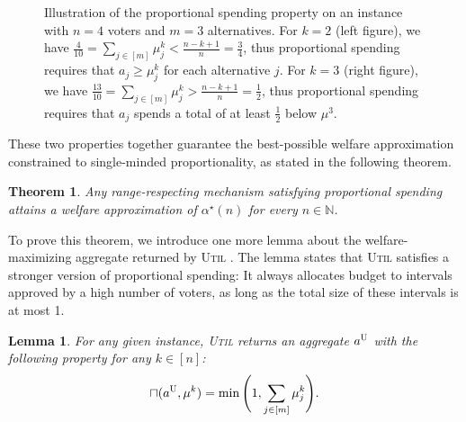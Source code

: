 \documentclass[11pt]{article}
\newcommand{\N}{\mathbb{N}}
\newcommand{\overlap}[2]{\sqcap(#1, #2)}
\newcommand{\Ut}{\textsc{Util} }
\newcommand{\Uts}{\textsc{U} } %
\newtheorem{theorem}{Theorem}
\newtheorem{lemma}{Lemma}
\begin{document}
\begin{figure}
\begin{subfigure}[t]{0.48\textwidth}
    \end{subfigure}
    \caption{Illustration of the proportional spending property on an instance with $n = 4$ voters and $m = 3$ alternatives. For $k = 2$ (left figure), we have $\frac{4}{10} = \sum_{j \in [m]} \mu^k_j < \frac{n-k+1}{n} = \frac{3}{4}$, thus proportional spending requires that $a_j \ge \mu^k_j$ for each alternative $j$. For $k = 3$ (right figure), we have $\frac{13}{10} = \sum_{j \in [m]} \mu^k_j > \frac{n-k+1}{n} = \frac{1}{2}$, thus proportional spending requires that $a_j$ spends a total of at least $\frac{1}{2}$ below $\mu^3$.}
    \label{fig:proportionalSpending}
\end{figure}






These two properties together guarantee the best-possible welfare approximation constrained to single-minded proportionality, as stated in the following theorem.

\begin{theorem}\label{thm:optimal_social_welfare_approximation}
    Any range-respecting mechanism satisfying proportional spending attains a welfare approximation of $\alpha^\star(n)$ for every $n\in \N$.
\end{theorem}

To prove this theorem, we introduce one more lemma about the welfare-maximizing aggregate returned by \Ut. The lemma states that \Ut satisfies a stronger version of proportional spending: It always allocates budget to intervals approved by a high number of voters, as long as the total size of these intervals is at most 1.

\begin{lemma} \label{lem:Util_lower_bound}
    For any given instance, \Ut returns an aggregate $a^\Uts$ with the following property for any $k \in [n]$:
    $$ \overlap{a^\Uts}{\mu^k} = \min\Bigg( 1, \sum_{j \in [m]} \mu^k_j \Bigg).$$
\end{lemma}
\end{document}

